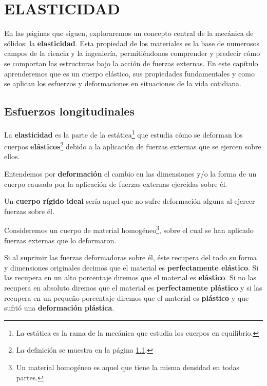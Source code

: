 \chapter[Elasticidad]{ELASTICIDAD}
\startcontents
\printchaptertableofcontents

En las páginas que siguen, exploraremos un concepto central de la mecánica de sólidos: la \textbf{elasticidad}. Esta propiedad de los materiales es la base de numerosos campos de la ciencia y la ingeniería, permitiéndonos comprender y predecir cómo se comportan las estructuras bajo la acción de fuerzas externas. En este capítulo aprenderemos que es un cuerpo elástico, sus propiedades fundamentales y como se aplican los esfuerzos y deformaciones en situaciones de la vida cotidiana.

\section{Esfuerzos longitudinales}

La \textbf{elasticidad} es la parte de la estática\footnote{La estática es la rama de la mecánica que estudia los cuerpos en equilibrio.} que estudia cómo se deforman los cuerpos \textbf{elásticos}\footnote{La definición se muestra en la página \ref{}.} debido a la
aplicación de fuerzas externas que se ejercen sobre ellos.

\begin{definition}{}{}
    Entendemos por \textbf{deformación} el cambio en las dimensiones y/o la forma de un cuerpo causado por la aplicación de fuerzas externas ejercidas sobre él.
\end{definition}

Un \textbf{cuerpo rígido ideal} sería aquel que no sufre deformación alguna al ejercer fuerzas sobre él.

Consideremos un cuerpo de material homogéneo\footnote{Un material homogéneo es aquel que tiene la misma densidad en todas partes.}, sobre el cual se han aplicado fuerzas externas que lo deformaron.

Si al suprimir las fuerzas deformadoras sobre él, éste recupera del todo su forma y dimensiones originales decimos que el material es \textbf{perfectamente elástico}. Si las recupera en un alto porcentaje diremos que el material es \textbf{elástico}. Si no las recupera en absoluto diremos que el material es \textbf{perfectamente plástico} y si las recupera en un pequeño porcentaje diremos que el material es \textbf{plástico} y que sufrió una \textbf{deformación plástica}.

